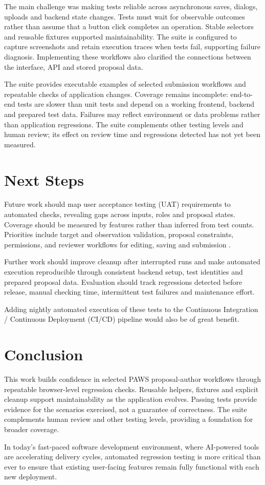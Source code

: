 \documentclass[11pt,twoside]{article}
\begin{document}
The main challenge was making tests reliable across asynchronous saves, dialogs, uploads and backend state changes. Tests must wait for observable outcomes rather than assume that a button click completes an operation. Stable selectors and reusable fixtures supported maintainability. The suite is configured to capture screenshots and retain execution traces when tests fail, supporting failure diagnosis. Implementing these workflows also clarified the connections between the interface, API and stored proposal data.

The suite provides executable examples of selected submission workflows and repeatable checks of application changes. Coverage remains incomplete: end-to-end tests are slower than unit tests and depend on a working frontend, backend and prepared test data. Failures may reflect environment or data problems rather than application regressions. The suite complements other testing levels and human review; its effect on review time and regressions detected has not yet been measured.


\section{Next Steps}

Future work should map user acceptance testing (UAT) requirements to automated checks, revealing gaps across inputs, roles and proposal states. Coverage should be measured by features rather than inferred from test counts. Priorities include target and observation validation, proposal constraints, permissions, and reviewer workflows for editing, saving and submission \citep{SchwartzBaloyi2024PAWSReview}.

Further work should improve cleanup after interrupted runs and make automated execution reproducible through consistent backend setup, test identities and prepared proposal data. Evaluation should track regressions detected before release, manual checking time, intermittent test failures and maintenance effort.

Adding nightly automated execution of these tests to the Continuous Integration / Continuous Deployment (CI/CD) pipeline would also be of great benefit.


\section{Conclusion}

This work builds confidence in selected PAWS proposal-author workflows through repeatable browser-level regression checks. Reusable helpers, fixtures and explicit cleanup support maintainability as the application evolves. Passing tests provide evidence for the scenarios exercised, not a guarantee of correctness. The suite complements human review and other testing levels, providing a foundation for broader coverage.

In today's fast-paced software development environment, where AI-powered tools are accelerating delivery cycles, automated regression testing is more critical than ever to ensure that existing user-facing features remain fully functional with each new deployment.


\end{document}

